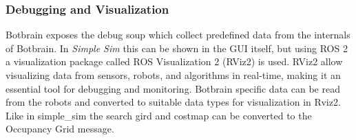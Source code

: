 \subsubsection{Debugging and Visualization}\label{sec:debugging_rviz}
Botbrain exposes the debug soup which collect predefined data from the internals of Botbrain. 
In \textit{Simple Sim} this can be shown in the GUI itself, but using ROS 2 a visualization package called ROS Visualization 2 (RViz2) is used.
RViz2 allow visualizing data from sensors, robots, and algorithms in real-time, making it an essential tool for debugging and monitoring.
Botbrain specific data can be read from the robots and converted to suitable data types for visualization in Rviz2. Like in simple\_sim the search gird and costmap can be converted to the Occupancy Grid message.
